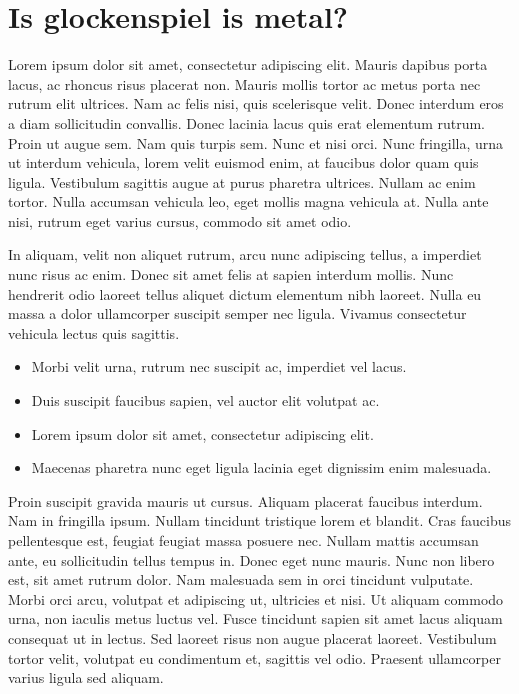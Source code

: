 \documentclass{article}
\begin{document}
\section{Is glockenspiel is metal?}\hypertarget{is-glockenspiel-is-metal}{}\label{is-glockenspiel-is-metal}

Lorem ipsum dolor sit amet, consectetur adipiscing elit. Mauris dapibus porta lacus, ac rhoncus risus placerat non. Mauris mollis tortor ac metus porta nec rutrum elit ultrices. Nam ac felis nisi, quis scelerisque velit. Donec interdum eros a diam sollicitudin convallis. Donec lacinia lacus quis erat elementum rutrum. Proin ut augue sem. Nam quis turpis sem. Nunc et nisi orci. Nunc fringilla, urna ut interdum vehicula, lorem velit euismod enim, at faucibus dolor quam quis ligula. Vestibulum sagittis augue at purus pharetra ultrices. Nullam ac enim tortor. Nulla accumsan vehicula leo, eget mollis magna vehicula at. Nulla ante nisi, rutrum eget varius cursus, commodo sit amet odio.

In aliquam, velit non aliquet rutrum, arcu nunc adipiscing tellus, a imperdiet nunc risus ac enim. Donec sit amet felis at sapien interdum mollis. Nunc hendrerit odio laoreet tellus aliquet dictum elementum nibh laoreet. Nulla eu massa a dolor ullamcorper suscipit semper nec ligula. Vivamus consectetur vehicula lectus quis sagittis.

\begin{itemize}
\item Morbi velit urna, rutrum nec suscipit ac, imperdiet vel lacus.
\item Duis suscipit faucibus sapien, vel auctor elit volutpat ac.
\item Lorem ipsum dolor sit amet, consectetur adipiscing elit.
\item Maecenas pharetra nunc eget ligula lacinia eget dignissim enim malesuada.
\end{itemize}

Proin suscipit gravida mauris ut cursus. Aliquam placerat faucibus interdum. Nam in fringilla ipsum. Nullam tincidunt tristique lorem et blandit. Cras faucibus pellentesque est, feugiat feugiat massa posuere nec. Nullam mattis accumsan ante, eu sollicitudin tellus tempus in. Donec eget nunc mauris. Nunc non libero est, sit amet rutrum dolor. Nam malesuada sem in orci tincidunt vulputate. Morbi orci arcu, volutpat et adipiscing ut, ultricies et nisi. Ut aliquam commodo urna, non iaculis metus luctus vel. Fusce tincidunt sapien sit amet lacus aliquam consequat ut in lectus. Sed laoreet risus non augue placerat laoreet. Vestibulum tortor velit, volutpat eu condimentum et, sagittis vel odio. Praesent ullamcorper varius ligula sed aliquam.
\end{document}

